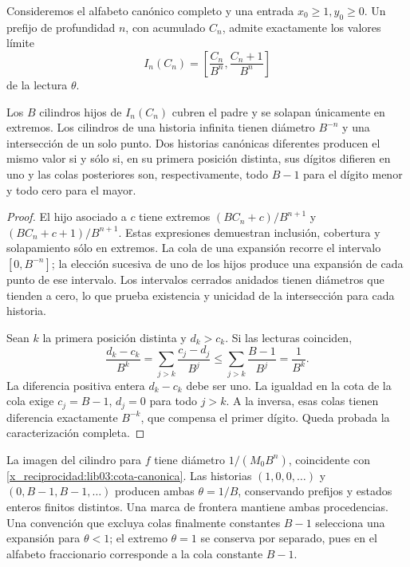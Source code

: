 Consideremos el alfabeto canónico completo y una entrada
\(x_0\geq1,y_0\geq0\). Un prefijo de profundidad \(n\), con
acumulado \(C_n\), admite exactamente los valores límite
\begin{equation}
 I_n(C_n)=\left[\frac{C_n}{B^n},\frac{C_n+1}{B^n}\right]
 \label{x_reciprocidad:lib03:cilindro}
\end{equation}
de la lectura \(\theta\).

\begin{theorem}
\label{x_reciprocidad:lib03:teo-cilindros}
Los \(B\) cilindros hijos de \(I_n(C_n)\) cubren el padre y se
solapan únicamente en extremos. Los cilindros de una historia infinita
tienen diámetro \(B^{-n}\) y una intersección de un solo punto.
Dos historias canónicas diferentes producen el mismo valor si y sólo
si, en su primera posición distinta, sus dígitos difieren en uno y las
colas posteriores son, respectivamente, todo \(B-1\) para el dígito
menor y todo cero para el mayor.
\end{theorem}

\begin{proof}
El hijo asociado a \(c\) tiene extremos
\((BC_n+c)/B^{n+1}\) y \((BC_n+c+1)/B^{n+1}\).
Estas expresiones demuestran inclusión, cobertura y solapamiento sólo
en extremos. La cola de una expansión recorre el intervalo
\([0,B^{-n}]\); la elección sucesiva de uno de los hijos produce una
expansión de cada punto de ese intervalo. Los intervalos cerrados
anidados tienen diámetros que tienden a cero, lo que prueba existencia
y unicidad de la intersección para cada historia.

Sean \(k\) la primera posición distinta y \(d_k>c_k\). Si las
lecturas coinciden,
\[
 \frac{d_k-c_k}{B^k}
 =\sum_{j>k}\frac{c_j-d_j}{B^j}
 \leq\sum_{j>k}\frac{B-1}{B^j}=\frac1{B^k}.
\]
La diferencia positiva entera \(d_k-c_k\) debe ser uno. La igualdad
en la cota de la cola exige \(c_j=B-1\), \(d_j=0\) para todo
\(j>k\). A la inversa, esas colas tienen diferencia exactamente
\(B^{-k}\), que compensa el primer dígito. Queda probada la
caracterización completa.
\end{proof}

La imagen del cilindro para \(f\) tiene diámetro
\(1/(M_0B^n)\), coincidente con \eqref{x_reciprocidad:lib03:cota-canonica}.
Las historias \((1,0,0,\ldots)\) y
\((0,B-1,B-1,\ldots)\) producen ambas \(\theta=1/B\), conservando
prefijos y estados enteros finitos distintos. Una marca de frontera
mantiene ambas procedencias. Una convención que excluya colas finalmente
constantes \(B-1\) selecciona una expansión para \(\theta<1\);
el extremo \(\theta=1\) se conserva por separado, pues en el
alfabeto fraccionario corresponde a la cola constante \(B-1\).

